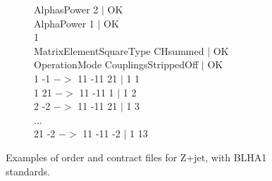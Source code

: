 \begin{figure}[htb!]
\begin{subfigure}[]{0.49\textwidth}
{{AlphasPower 2 $|$ OK\\
AlphaPower  1   $|$ OK\\           1\\
MatrixElementSquareType CHsummed $|$ OK\\
OperationMode  CouplingsStrippedOff $|$ OK\\
1 -1 $->$ 11 -11 21 $|$ 1 1\\
1 21 $->$ 11 -11 1  $|$ 1 2\\
2 -2 $->$ 11 -11 21 $|$ 1 3\\
...\\
21 -2 $->$ 11 -11 -2 $|$ 1 13\\}
}
\end{subfigure}
\caption{Examples of order and contract files for Z+jet, with BLHA1 standards.}
\label{fig:BLHA1}
\end{figure}  



